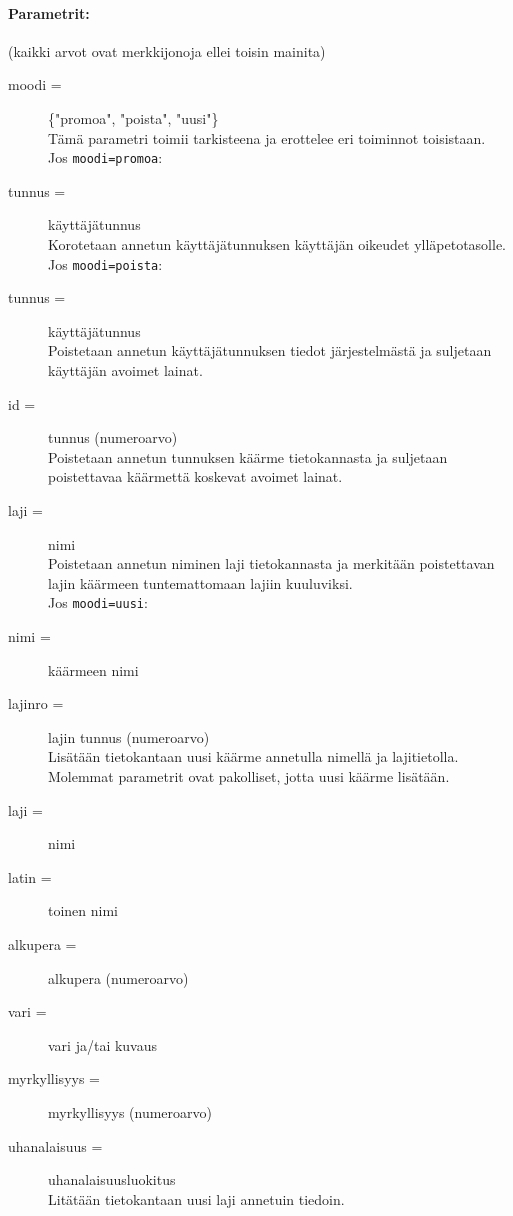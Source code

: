 \documentclass[11pt]{article}
\begin{document}
\paragraph{Parametrit:} (kaikki arvot ovat merkkijonoja ellei toisin mainita)
\begin{description}

\item[moodi =] \{"promoa", "poista", "uusi"\} \hfill \\
Tämä parametri toimii tarkisteena ja erottelee eri toiminnot toisistaan. \\

Jos \texttt{moodi=promoa}:

\item[tunnus =] käyttäjätunnus \hfill \\
Korotetaan annetun käyttäjätunnuksen käyttäjän oikeudet ylläpetotasolle. \\

Jos \texttt{moodi=poista}:

\item[tunnus =] käyttäjätunnus \hfill \\
Poistetaan annetun käyttäjätunnuksen tiedot järjestelmästä ja suljetaan käyttäjän avoimet lainat.

\item[id =] tunnus (numeroarvo) \hfill \\
Poistetaan annetun tunnuksen käärme tietokannasta ja suljetaan poistettavaa käärmettä koskevat avoimet lainat.

\item[laji =] nimi \hfill \\
Poistetaan annetun niminen laji tietokannasta ja merkitään poistettavan lajin käärmeen tuntemattomaan lajiin kuuluviksi. \\

Jos \texttt{moodi=uusi}:

\item[nimi =] käärmeen nimi
\item[lajinro =] lajin tunnus (numeroarvo) \hfill \\
Lisätään tietokantaan uusi käärme annetulla nimellä ja lajitietolla. Molemmat parametrit ovat pakolliset, jotta uusi käärme lisätään.

\item[laji =] nimi
\item[latin =] toinen nimi
\item[alkupera =] alkupera (numeroarvo)
\item[vari =] vari ja/tai kuvaus
\item[myrkyllisyys =] myrkyllisyys (numeroarvo)
\item[uhanalaisuus =] uhanalaisuusluokitus \hfill \\
Litätään tietokantaan uusi laji annetuin tiedoin.
\end{description}
\end{document}
